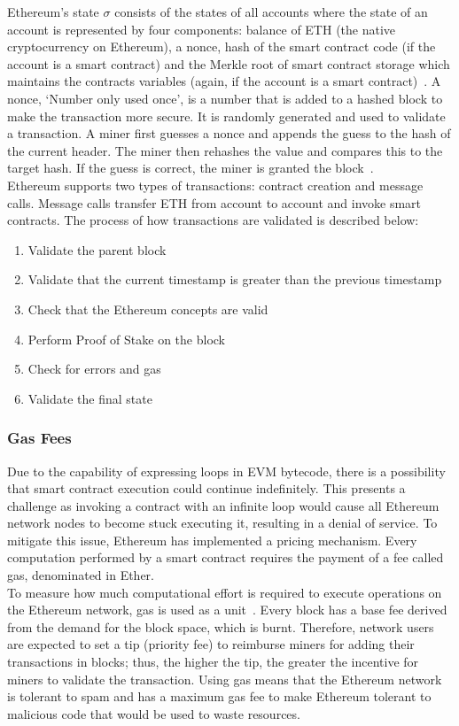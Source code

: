 \noindent Ethereum's state $\sigma$ consists of the states of all accounts where the state of an account is represented by four components: balance of ETH (the native cryptocurrency on Ethereum), a nonce, hash of the smart contract code (if the account is a smart contract) and the Merkle root of smart contract storage which maintains the contracts variables (again, if the account is a smart contract)~\cite{ethereum_yellowpaper}. A nonce, `Number only used once', is a number that is added to a hashed block to make the transaction more secure. It is randomly generated and used to validate a transaction. A miner first guesses a nonce and appends the guess to the hash of the current header. The miner then rehashes the value and compares this to the target hash. If the guess is correct, the miner is granted the block~\cite{noauthor_components_2021}.
\\[3mm]
Ethereum supports two types of transactions: contract creation and message calls. Message calls transfer ETH from account to account and invoke smart contracts. The process of how transactions are validated is described below:
\begin{enumerate}
    \itemsep0em
    \item Validate the parent block
    \item Validate that the current timestamp is greater than the previous timestamp
    \item Check that the Ethereum concepts are valid
    \item Perform Proof of Stake on the block
    \item Check for errors and gas
    \item Validate the final state
\end{enumerate}

\subsubsection{Gas Fees}
Due to the capability of expressing loops in EVM bytecode, there is a possibility that smart contract execution could continue indefinitely. This presents a challenge as invoking a contract with an infinite loop would cause all Ethereum network nodes to become stuck executing it, resulting in a denial of service. To mitigate this issue, Ethereum has implemented a pricing mechanism. Every computation performed by a smart contract requires the payment of a fee called gas, denominated in Ether.
\\[3mm]
To measure how much computational effort is required to execute operations on the Ethereum network, gas is used as a unit~\cite{noauthor_gas_nodate}. Every block has a base fee derived from the demand for the block space, which is burnt. Therefore, network users are expected to set a tip (priority fee) to reimburse miners for adding their transactions in blocks; thus, the higher the tip, the greater the incentive for miners to validate the transaction. Using gas means that the Ethereum network is tolerant to spam and has a maximum gas fee to make Ethereum tolerant to malicious code that would be used to waste resources.

